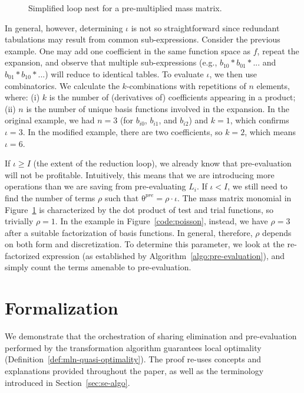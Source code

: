 \begin{figure}[h]\begin{CenteredBox}

\end{CenteredBox}\caption{Simplified loop nest for a pre-multiplied mass matrix.}\label{code:increase_factor}\end{figure}

In general, however, determining $\iota$ is not so straightforward since redundant tabulations may result from common sub-expressions. Consider the previous example. One may add one coefficient in the same function space as $f$, repeat the expansion, and observe that multiple sub-expressions (e.g., $b_{10}*b_{01}*...$ and $b_{01}*b_{10}*...$) will reduce to identical tables. To evaluate $\iota$, we then use combinatorics. We calculate the $k$-combinations with repetitions of $n$ elements, where: (i) $k$ is the number of (derivatives of) coefficients appearing in a product; (ii) $n$ is the number of unique basis functions involved in the expansion. In the original example, we had $n=3$ (for $b_{i0}$, $b_{i1}$, and $b_{i2}$) and $k=1$, which confirms $\iota=3$. In the modified example, there are two coefficients, so $k=2$, which means $\iota=6$.

If $\iota \geq I$ (the extent of the reduction loop), we already know that pre-evaluation will not be profitable. Intuitively, this means that we are introducing more operations than we are saving from pre-evaluating $L_i$. If $\iota < I$, we still need to find the number of terms $\rho$ such that $\mathrm{\theta}^{pre} = \rho \cdot \iota$. The mass matrix monomial in Figure~\ref{code:increase_factor} is characterized by the dot product of test and trial functions, so trivially $\rho = 1$. In the example in Figure~\ref{code:poisson}, instead, we have $\rho = 3$ after a suitable factorization of basis functions. In general, therefore, $\rho$ depends on both form and discretization. To determine this parameter, we look at the re-factorized expression (as established by Algorithm~\ref{algo:pre-evaluation}), and simply count the terms amenable to pre-evaluation.

\section{Formalization}
\label{sec:proof}
We demonstrate that the orchestration of sharing elimination and pre-evaluation performed by the transformation algorithm guarantees local optimality (Definition~\ref{def:mln-quasi-optimality}). The proof re-uses concepts and explanations provided throughout the paper, as well as the terminology introduced in Section~\ref{sec:se-algo}.

